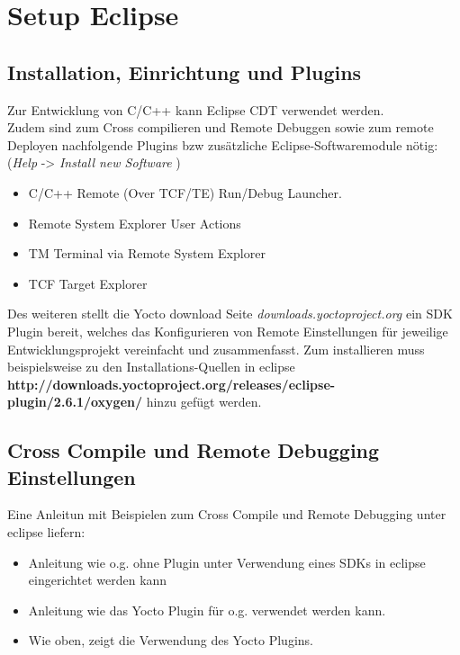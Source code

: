 \chapter{Setup Eclipse}%
\label{cha:setup_eclipse}

\section{Installation,  Einrichtung und Plugins}%
\label{sec:installation__einrichtung_plugins}

Zur Entwicklung von C/C++ kann Eclipse CDT verwendet werden. \\


Zudem sind zum Cross compilieren und Remote Debuggen sowie zum remote
Deployen nachfolgende Plugins bzw zusätzliche Eclipse-Softwaremodule nötig:
(\textit{Help} -> \textit{Install new Software} )

\begin{itemize}
    \item C/C++ Remote (Over TCF/TE) Run/Debug Launcher.
    \item Remote System Explorer User Actions
    \item TM Terminal via Remote System Explorer
    \item TCF Target Explorer
\end{itemize}

Des weiteren stellt die Yocto download Seite \textit{downloads.yoctoproject.org}
ein SDK Plugin bereit, welches das Konfigurieren von Remote Einstellungen
für jeweilige Entwicklungsprojekt vereinfacht und zusammenfasst. Zum
installieren muss beispielsweise zu den Installations-Quellen in eclipse
\textbf{http://downloads.yoctoproject.org/releases/eclipse-plugin/2.6.1/oxygen/}
hinzu gefügt werden.


\section{Cross Compile und Remote Debugging Einstellungen}%
\label{sec:cross_compile_und_remote_debugging_einstellungen}

Eine Anleitun mit Beispielen zum Cross Compile und Remote Debugging unter
eclipse liefern:
\begin{itemize}
    \item \textbf{\cite[Working with Eclipse]{PhyTec:Development_Guid}} Anleitung wie o.g. ohne Plugin
        unter Verwendung eines SDKs in eclipse eingerichtet werden kann
    \item \textbf{\cite[Seite
        249-269]{Gonzalez2018:Embedded_Linux_Development_Using_Yocto_Project_Cookbook_2nd}}
        Anleitung wie das Yocto Plugin für o.g. verwendet werden kann.
    \item \textbf{\cite{Variwiki:Yocto_Eclipse_Plugin}} Wie oben, zeigt die Verwendung des Yocto Plugins.

\end{itemize}
